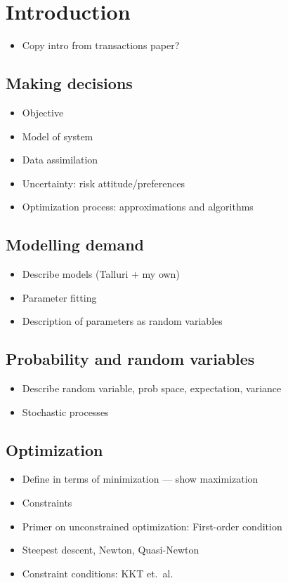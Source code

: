 \documentclass[main.tex]{subfiles}
\begin{document}
\chapter{Introduction}


\begin{itemize}
\item Copy intro from transactions paper?
\end{itemize}

\section{Making decisions}

\begin{itemize}
\item Objective
\item Model of system
\item Data assimilation
\item Uncertainty: risk attitude/preferences
\item Optimization process: approximations and algorithms
\end{itemize}


\section{Modelling demand}
\begin{itemize}
\item Describe models (Talluri + my own)
\item Parameter fitting
\item Description of parameters as random variables
\end{itemize}

\section{Probability and random variables}
\begin{itemize}
\item Describe random variable, prob space, expectation, variance
\item Stochastic processes
\end{itemize}

\section{Optimization}

\begin{itemize}
\item Define in terms of minimization --- show maximization
\item Constraints
\item Primer on unconstrained optimization: First-order condition
\item Steepest descent, Newton, Quasi-Newton
\item Constraint conditions: KKT et.\ al.
\end{itemize}

\biblio{} %
\end{document}
